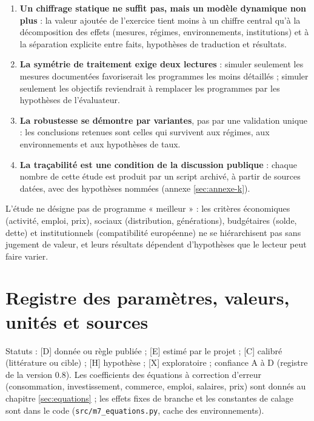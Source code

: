 \documentclass[
  11pt,
  11pt,
  a4paper,
  openany]{book}
\providecommand{\tightlist}{%
  \setlength{\itemsep}{0pt}\setlength{\parskip}{0pt}}
\begin{document}
\begin{enumerate}
\def\labelenumi{\arabic{enumi}.}
\tightlist
\item
  \textbf{Un chiffrage statique ne suffit pas, mais un modèle dynamique
  non plus} : la valeur ajoutée de l'exercice tient moins à un chiffre
  central qu'à la décomposition des effets (mesures, régimes,
  environnements, institutions) et à la séparation explicite entre
  faits, hypothèses de traduction et résultats.
\item
  \textbf{La symétrie de traitement exige deux lectures} : simuler
  seulement les mesures documentées favoriserait les programmes les
  moins détaillés ; simuler seulement les objectifs reviendrait à
  remplacer les programmes par les hypothèses de l'évaluateur.
\item
  \textbf{La robustesse se démontre par variantes}, pas par une
  validation unique : les conclusions retenues sont celles qui survivent
  aux régimes, aux environnements et aux hypothèses de taux.
\item
  \textbf{La traçabilité est une condition de la discussion publique} :
  chaque nombre de cette étude est produit par un script archivé, à
  partir de sources datées, avec des hypothèses nommées (annexe
  \ref{sec:annexe-k}).
\end{enumerate}

L'étude ne désigne pas de programme « meilleur » : les critères
économiques (activité, emploi, prix), sociaux (distribution,
générations), budgétaires (solde, dette) et institutionnels
(compatibilité européenne) ne se hiérarchisent pas sans jugement de
valeur, et leurs résultats dépendent d'hypothèses que le lecteur peut
faire varier.

\appendix

\hypertarget{sec:annexe-a}{%
\chapter{Registre des paramètres, valeurs, unités et
sources}\label{sec:annexe-a}}

Statuts : {[}D{]} donnée ou règle publiée ; {[}E{]} estimé par le projet
; {[}C{]} calibré (littérature ou cible) ; {[}H{]} hypothèse ; {[}X{]}
exploratoire ; confiance A à D (registre de la version 0.8). Les
coefficients des équations à correction d'erreur (consommation,
investissement, commerce, emploi, salaires, prix) sont donnés au
chapitre \ref{sec:equations} ; les effets fixes de branche et les
constantes de calage sont dans le code (\texttt{src/m7\_equations.py},
cache des environnements).
\end{document}
